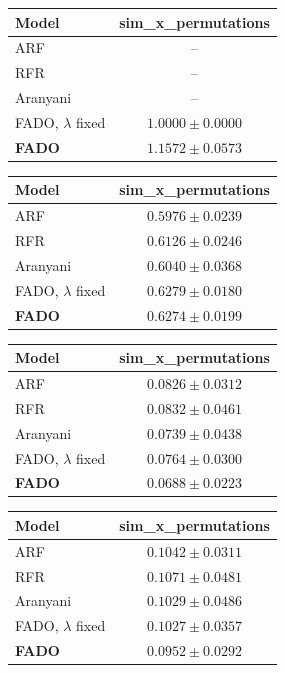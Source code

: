 \begin{tabular}{lc}
\toprule
\textbf{Model} & sim\_x\_permutations \\
\midrule
ARF & -- \\
RFR & -- \\
Aranyani & -- \\
FADO, $\lambda$ fixed & $1.0000 \pm 0.0000$ \\
\textbf{FADO} & $1.1572 \pm 0.0573$ \\
\bottomrule
\end{tabular}

\begin{tabular}{lc}
\toprule
\textbf{Model} & sim\_x\_permutations \\
\midrule
ARF & $0.5976 \pm 0.0239$ \\
RFR & $0.6126 \pm 0.0246$ \\
Aranyani & $0.6040 \pm 0.0368$ \\
FADO, $\lambda$ fixed & $0.6279 \pm 0.0180$ \\
\textbf{FADO} & $0.6274 \pm 0.0199$ \\
\bottomrule
\end{tabular}

\begin{tabular}{lc}
\toprule
\textbf{Model} & sim\_x\_permutations \\
\midrule
ARF & $0.0826 \pm 0.0312$ \\
RFR & $0.0832 \pm 0.0461$ \\
Aranyani & $0.0739 \pm 0.0438$ \\
FADO, $\lambda$ fixed & $0.0764 \pm 0.0300$ \\
\textbf{FADO} & $0.0688 \pm 0.0223$ \\
\bottomrule
\end{tabular}

\begin{tabular}{lc}
\toprule
\textbf{Model} & sim\_x\_permutations \\
\midrule
ARF & $0.1042 \pm 0.0311$ \\
RFR & $0.1071 \pm 0.0481$ \\
Aranyani & $0.1029 \pm 0.0486$ \\
FADO, $\lambda$ fixed & $0.1027 \pm 0.0357$ \\
\textbf{FADO} & $0.0952 \pm 0.0292$ \\
\bottomrule
\end{tabular}


